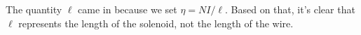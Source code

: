 The quantity $\ell$ came in because we set $\eta=NI/\ell$.
 Based on that, it's clear that $\ell$ represents the length of the solenoid, not the
 length of the wire.
